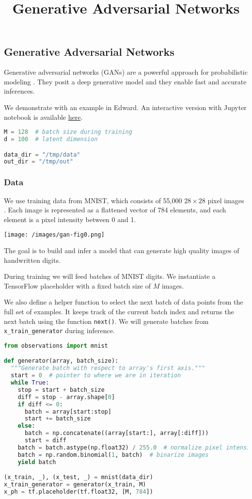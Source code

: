 \title{Generative Adversarial Networks}

\subsection{Generative Adversarial Networks}

Generative adversarial networks (GANs) are a powerful approach for
probabilistic modeling \citep{goodfellow2014generative,goodfellow2016nips}.
They posit a deep generative model and they enable fast and accurate
inferences.

We demonstrate with an example in Edward.
An interactive version with Jupyter notebook is available
\href{http://nbviewer.jupyter.org/github/blei-lab/edward/blob/master/notebooks/gan.ipynb}{here}.

\begin{lstlisting}[language=Python]
M = 128  # batch size during training
d = 100  # latent dimension

data_dir = "/tmp/data"
out_dir = "/tmp/out"
\end{lstlisting}

\subsubsection{Data}

We use training data from MNIST, which consists of 55,000 $28\times
28$ pixel images \citep{lecun1998gradient}. Each image is represented
as a flattened vector of 784 elements, and each element is a pixel
intensity between 0 and 1.

\texttt{[image: /images/gan-fig0.png]}

The goal is to build and infer a model that can generate high quality
images of handwritten digits.

During training we will feed batches of MNIST digits. We instantiate a
TensorFlow placeholder with a fixed batch size of $M$ images.

We also define a helper function to select the next batch of data
points from the full set of examples. It keeps track of the current
batch index and returns the next batch using the function \texttt{next()}.
We will generate batches from \texttt{x_train_generator} during inference.

\begin{lstlisting}[language=Python]
from observations import mnist

def generator(array, batch_size):
  """Generate batch with respect to array's first axis."""
  start = 0  # pointer to where we are in iteration
  while True:
    stop = start + batch_size
    diff = stop - array.shape[0]
    if diff <= 0:
      batch = array[start:stop]
      start += batch_size
    else:
      batch = np.concatenate((array[start:], array[:diff]))
      start = diff
    batch = batch.astype(np.float32) / 255.0  # normalize pixel intensities
    batch = np.random.binomial(1, batch)  # binarize images
    yield batch

(x_train, _), (x_test, _) = mnist(data_dir)
x_train_generator = generator(x_train, M)
x_ph = tf.placeholder(tf.float32, [M, 784])
\end{lstlisting}


